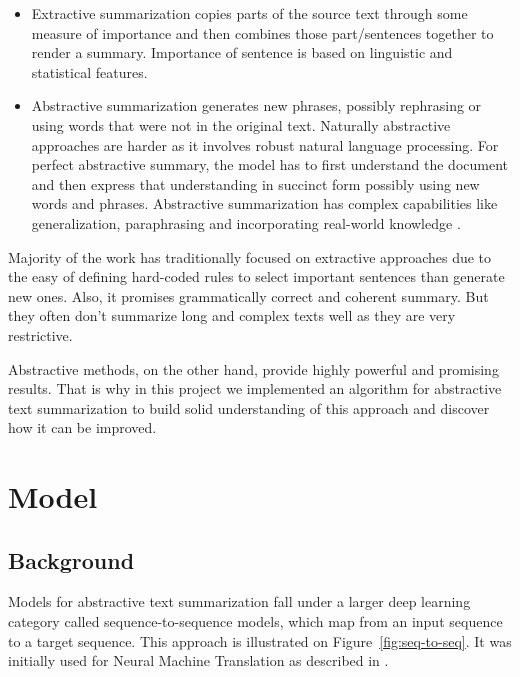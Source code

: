 \begin{itemize}
\setlength\itemsep{0.5em}

	\item Extractive summarization copies parts of the source text through some measure of importance and then combines those part/sentences together to render a summary. Importance of sentence is based on linguistic and statistical features.

	\item Abstractive summarization generates new phrases, possibly rephrasing or using words that were not in the original text. Naturally abstractive approaches are harder as it involves robust natural language processing. For perfect abstractive summary, the model has to first understand the document and then express that understanding in succinct form possibly using new words and phrases.  Abstractive summarization has complex capabilities like generalization, paraphrasing and incorporating  real-world knowledge \cite{abstractive_text_summarization}.
\end{itemize}

Majority of the work has traditionally focused on extractive approaches due to the easy of defining hard-coded rules to select important sentences than generate new ones. Also, it promises grammatically correct and coherent summary. But they often don’t summarize long and complex texts well as they are very restrictive.


Abstractive methods, on the other hand, provide highly powerful and promising results. That is why in this project we implemented an algorithm for abstractive text summarization to build solid understanding of this approach and discover how it can be improved.


\section{Model}
\subsection{Background}
Models for abstractive text summarization fall under a larger deep learning category called
sequence-to-sequence models, which map from an input sequence to a target sequence. This approach is illustrated on Figure~\ref{fig:seq-to-seq}. It was initially used for Neural Machine Translation as described in \cite{attention_based_NMT}. 


